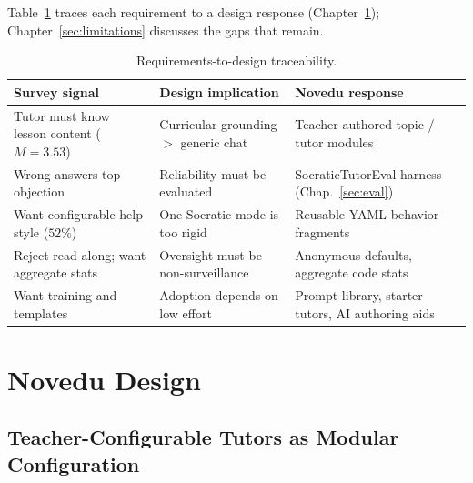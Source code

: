 \documentclass[runningheads]{llncs}
\begin{document}
Table~\ref{tab:trace} traces each requirement to a design response (Chapter~\ref{sec:design}); Chapter~\ref{sec:limitations} discusses the gaps that remain.

\begin{table}[t]
\centering
\caption{Requirements-to-design traceability.}
\label{tab:trace}
\renewcommand{\arraystretch}{1.0}
\footnotesize
\begin{tabular}{>{\raggedright\arraybackslash}p{3.6cm}>{\raggedright\arraybackslash}p{3.4cm}>{\raggedright\arraybackslash}p{3.9cm}}
\toprule
\textbf{Survey signal} & \textbf{Design implication} & \textbf{Novedu response} \\
\midrule
Tutor must know lesson content ($M{=}3.53$) & Curricular grounding $>$ generic chat & Teacher-authored topic / tutor modules \\
Wrong answers top objection & Reliability must be evaluated & SocraticTutorEval harness (Chap.~\ref{sec:eval}) \\
Want configurable help style ($52\%$) & One Socratic mode is too rigid & Reusable YAML behavior fragments \\
Reject read-along; want aggregate stats & Oversight must be non-surveillance & Anonymous defaults, aggregate code stats \\
Want training and templates & Adoption depends on low effort & Prompt library, starter tutors, AI authoring aids \\
\bottomrule
\end{tabular}
\end{table}

\section{Novedu Design}
\label{sec:design}

\subsection{Teacher-Configurable Tutors as Modular Configuration}
\label{sec:tutormodel}
\end{document}
